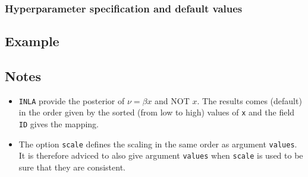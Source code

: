 \documentclass[a4paper,11pt]{article}
\begin{document}
\subsubsection*{Hyperparameter specification and default values}


\subsection*{Example}



\subsection*{Notes}

\begin{itemize}
\item \texttt{INLA} provide the posterior of $\nu=\beta x$ and NOT
    $x$.  The results comes (default) in the order given by the sorted
    (from low to high) values of \texttt{x} and the field \texttt{ID}
    gives the mapping.
\item The option \verb|scale| defines the scaling in the same order as
    argument \verb|values|.  It is therefore adviced to also give
    argument \verb|values| when \verb|scale| is used to be sure that
    they are consistent.
\end{itemize}
\end{document}

